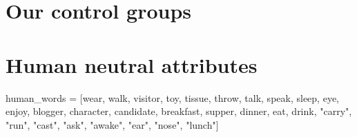 \documentclass[
  12pt,
]{book}
\newenvironment{Shaded}{\begin{snugshade}}{\end{snugshade}}
\newcommand{\NormalTok}[1]{#1}
\newcommand{\OtherTok}[1]{\textcolor[rgb]{0.56,0.35,0.01}{#1}}
\newcommand{\StringTok}[1]{\textcolor[rgb]{0.31,0.60,0.02}{#1}}
\begin{document}
\normalsize

\hypertarget{our-control-groups}{%
\section*{Our control groups}\label{our-control-groups}}

\hypertarget{human-neutral-attributes}{%
\section*{Human neutral attributes}\label{human-neutral-attributes}}

\vspace{1mm}
\scriptsize

\begin{Shaded}
\begin{Highlighting}[]
\NormalTok{human\_words }\OtherTok{=}\NormalTok{ [}\StringTok{\textquotesingle{}wear\textquotesingle{}}\NormalTok{, }\StringTok{\textquotesingle{}walk\textquotesingle{}}\NormalTok{, }\StringTok{\textquotesingle{}visitor\textquotesingle{}}\NormalTok{, }\StringTok{\textquotesingle{}toy\textquotesingle{}}\NormalTok{, }\StringTok{\textquotesingle{}tissue\textquotesingle{}}\NormalTok{, }\StringTok{\textquotesingle{}throw\textquotesingle{}}\NormalTok{, }\StringTok{\textquotesingle{}talk\textquotesingle{}}\NormalTok{, }
               \StringTok{\textquotesingle{}speak\textquotesingle{}}\NormalTok{, }\StringTok{\textquotesingle{}sleep\textquotesingle{}}\NormalTok{, }\StringTok{\textquotesingle{}eye\textquotesingle{}}\NormalTok{, }\StringTok{\textquotesingle{}enjoy\textquotesingle{}}\NormalTok{, }\StringTok{\textquotesingle{}blogger\textquotesingle{}}\NormalTok{, }\StringTok{\textquotesingle{}character\textquotesingle{}}\NormalTok{, }
               \StringTok{\textquotesingle{}candidate\textquotesingle{}}\NormalTok{, }\StringTok{\textquotesingle{}breakfast\textquotesingle{}}\NormalTok{, }\StringTok{\textquotesingle{}supper\textquotesingle{}}\NormalTok{, }\StringTok{\textquotesingle{}dinner\textquotesingle{}}\NormalTok{, }\StringTok{\textquotesingle{}eat\textquotesingle{}}\NormalTok{, }\StringTok{\textquotesingle{}drink\textquotesingle{}}\NormalTok{,}
               \StringTok{"carry"}\NormalTok{, }\StringTok{"run"}\NormalTok{, }\StringTok{"cast"}\NormalTok{, }\StringTok{"ask"}\NormalTok{, }\StringTok{"awake"}\NormalTok{, }\StringTok{"ear"}\NormalTok{, }\StringTok{"nose"}\NormalTok{, }\StringTok{"lunch"}\NormalTok{]}
\end{Highlighting}
\end{Shaded}
\end{document}
